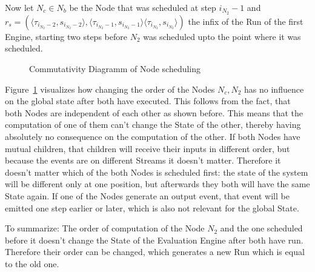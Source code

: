 Now let \(N_c \in N_b\) be the Node that was scheduled at step \(i_{N_2} - 1\) and
\(r_s = (\langle \tau_{i_{N_2} - 2}, s_{i_{N_2} - 2}\rangle, \langle\tau_{i_{N_2} - 1}, s_{i_{N_2} - 1}\rangle \langle\tau_{i_{N_2}}, s_{i_{N_2}}\rangle)\)
the infix of the Run of the first Engine, starting two steps before \(N_2\) was scheduled upto the point where it was scheduled.

\begin{figure}
  \caption{Commutativity Diagramm of Node scheduling}
\label{fig:chap3:sec_sync:commutativity_scheduling}
\end{figure}

Figure~\ref{fig:chap3:sec_sync:commutativity_scheduling} visualizes how changing the order of the Nodes \(N_c, N_2\) has no influence on the global state after both have executed.
This follows from the fact, that both Nodes are independent of each other as shown before.
This means that the computation of one of them can't change the State of the other, thereby having absolutely no consequence on the computation of the other.
If both Nodes have mutual children, that children will receive their inputs in different order, but because the events are  on different Streams it doesn't matter.
Therefore it doesn't matter which of the both Nodes is scheduled first: the state of the system will be different only at one position, but afterwards they both will have the same State again.
If one of the Nodes generate an output event, that event will be emitted one step earlier or later, which is also not relevant for the global State.

To summarize: The order of computation of the Node \(N_2\) and the one scheduled before it doesn't change the State of the Evaluation Engine after both have run.
Therefore their order can be changed, which generates a new Run which is equal to the old one.


